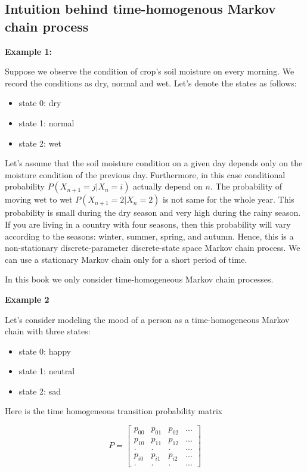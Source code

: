 \documentclass[
  letterpaper,
  DIV=11,
  numbers=noendperiod]{scrreprt}
\begin{document}
\subsection{Intuition behind time-homogenous Markov chain
process}\label{intuition-behind-time-homogenous-markov-chain-process}

\textbf{Example 1:}

Suppose we observe the condition of crop's soil moisture on every
morning. We record the conditions as dry, normal and wet. Let's denote
the states as follows:

\begin{itemize}
\item
  state 0: dry
\item
  state 1: normal
\item
  state 2: wet
\end{itemize}

Let's assume that the soil moisture condition on a given day depends
only on the moisture condition of the previous day. Furthermore, in this
case conditional probability \(P(X_{n+1}=j|X_n=i)\) actually depend on
\(n\). The probability of moving wet to wet \(P(X_{n+1}=2|X_n=2)\) is
not same for the whole year. This probability is small during the dry
season and very high during the rainy season. If you are living in a
country with four seasons, then this probability will vary according to
the seasons: winter, summer, spring, and autumn. Hence, this is a
non-stationary discrete-parameter discrete-state space Markov chain
process. We can use a stationary Markov chain only for a short period of
time.

In this book we only consider time-homogeneous Markov chain processes.

\textbf{Example 2}

Let's consider modeling the mood of a person as a time-homogeneous
Markov chain with three states:

\begin{itemize}
\item
  state 0: happy
\item
  state 1: neutral
\item
  state 2: sad
\end{itemize}

Here is the time homogeneous transition probability matrix

\[P = \left[\begin{array}{cccccccc}
p_{00} & p_{01} & p_{02} & ...\\
p_{10} & p_{11} & p_{12} & ...\\
. & . & . & ...\\
p_{i0} & p_{i1} & p_{i2} & ...\\
. & . & . & ...
\end{array}\right]\]
\end{document}
